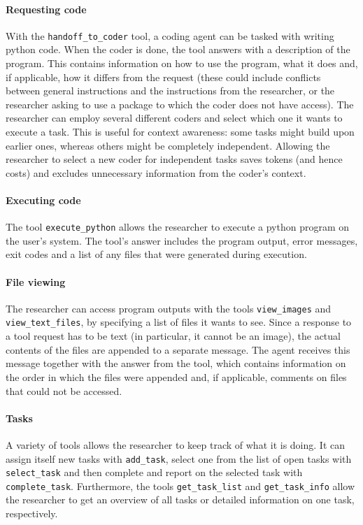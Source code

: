 \documentclass[submission, Phys]{SciPost}
\begin{document}
\paragraph{Requesting code}
With the \verb|handoff_to_coder| tool, a coding agent can be tasked with writing python code. When the coder is done, the tool answers with a description of the program. This contains information on how to use the program, what it does and, if applicable, how it differs from the request (these could include conflicts between general instructions and the instructions from the researcher, or the researcher asking to use a package to which the coder does not have access). The researcher can employ several different coders and select which one it wants to execute a task. This is useful for context awareness: some tasks might build upon earlier ones, whereas others might be completely independent. Allowing the researcher to select a new coder for independent tasks saves tokens (and hence costs) and excludes unnecessary information from the coder's context. 

\paragraph{Executing code}
The tool \verb|execute_python| allows the researcher to execute a python program on the user's system. The tool's answer includes the program output, error messages, exit codes and a list of any files that were generated during execution.

\paragraph{File viewing}
The researcher can access program outputs with the tools \verb|view_images| and \verb|view_text_files|, by specifying a list of files it wants to see. Since a response to a tool request has to be text (in particular, it cannot be an image), the actual contents of the files are appended to a separate message. The agent receives this message together with the answer from the tool, which contains information on the order in which the files were appended and, if applicable, comments on files that could not be accessed.

\paragraph{Tasks} A variety of tools allows the researcher to keep track of what it is doing. It can assign itself new tasks with \verb|add_task|, select one from the list of open tasks with \verb|select_task| and then complete and report on the selected task with \verb|complete_task|. Furthermore, the tools \verb|get_task_list| and \verb|get_task_info| allow the researcher to get an overview of all tasks or detailed information on one task, respectively.
\end{document}
